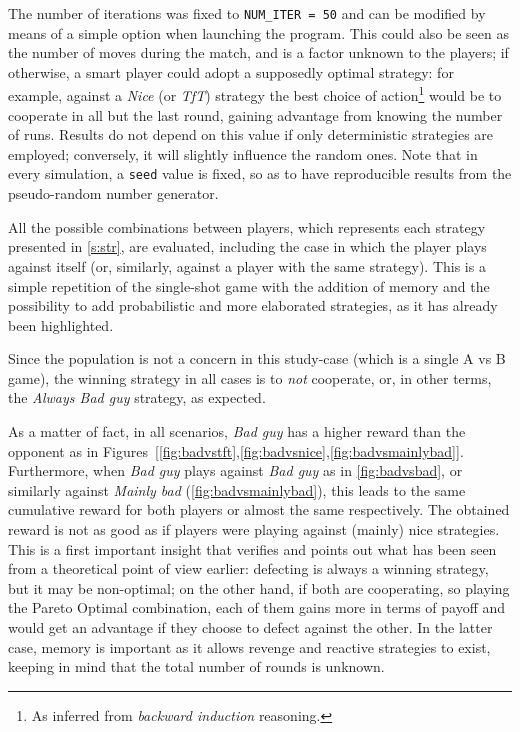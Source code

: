 \documentclass[journal,10pt,twoside]{IEEEtran}
\begin{document}
The number of iterations was fixed to \texttt{NUM\_ITER = 50} and can be modified by means of a simple option when launching the program.
This could also be seen as the number of moves during the match, and is a factor unknown to the players; if otherwise, a smart player could adopt a supposedly optimal strategy: for example, against a \textit{Nice} (or \textit{TfT}) strategy the best choice of action\footnote{As inferred from \textit{backward induction} reasoning.} would be to cooperate in all but the last round, gaining advantage from knowing the number of runs.
Results do not depend on this value if only deterministic strategies are employed; conversely, it will slightly influence the random ones.
Note that in every simulation, a \texttt{seed} value is fixed, so as to have reproducible results from the pseudo-random number generator.

All the possible combinations between players, which represents each strategy presented in \autoref{s:str}, are evaluated, including the case in which the player plays against itself (or, similarly, against a player with the same strategy).
This is a simple repetition of the single-shot game with the addition of memory and the possibility to add probabilistic and more elaborated strategies, as it has already been highlighted.

Since the population is not a concern in this study-case (which is a single A vs B game), the winning strategy in all cases is to \textit{not} cooperate, or, in other terms, the \textit{Always Bad guy} strategy, as expected.

As a matter of fact, in all scenarios, \textit{Bad guy} has a higher reward than the opponent as in Figures~[\ref{fig:badvstft},\ref{fig:badvsnice},\ref{fig:badvsmainlybad}]. 
Furthermore, when \textit{Bad guy} plays against \textit{Bad guy} as in \autoref{fig:badvsbad}, or similarly against \textit{Mainly bad} (\autoref{fig:badvsmainlybad}), this leads to the same cumulative reward for both players or almost the same respectively. The obtained reward is not as good as if players were playing against (mainly) nice strategies.
This is a first important insight that verifies and points out what has been seen from a theoretical point of view earlier: defecting is always a winning strategy, but it may be non-optimal; on the other hand, if both are cooperating, so playing the Pareto Optimal combination, each of them gains more in terms of payoff and would get an advantage if they choose to defect against the other. In the latter case, memory is important as it allows revenge and reactive strategies to exist, keeping in mind that the total number of rounds is unknown. 
\end{document}
